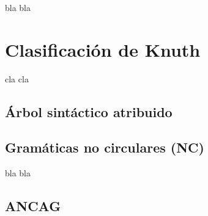 bla bla

\section{Clasificación de Knuth}

cla cla

\subsection{Árbol sintáctico atribuido}


\subsection{Gramáticas no circulares (NC)}

bla bla

\subsection{ANCAG}
